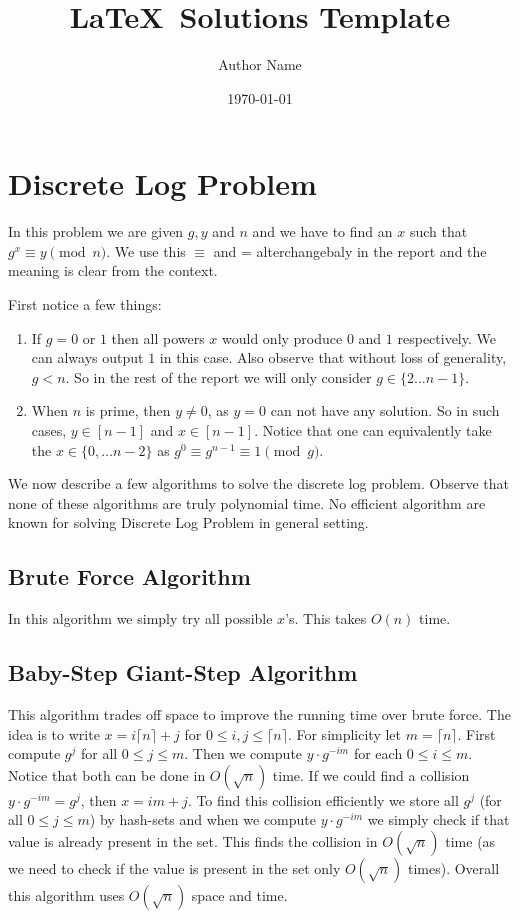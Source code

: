 \documentclass[letterpaper,12pt]{article}
\theoremstyle{remark}
\begin{document}
\title{\LaTeX\ Solutions Template}
\date{\today}
\author{Author Name}
\maketitle

\section{Discrete Log Problem}

In this problem we are given $g, y$ and $n$ and we have to find an $x$ such that $g^x \equiv y \pmod n$. We use this $\equiv$ and = alterchangebaly in the report and the meaning is clear from the context.

First notice a few things:
\begin{enumerate}
    \item If $g = 0$ or $1$ then all powers $x$ would only produce $0$ and $1$ respectively. We can always output $1$ in this case. Also observe that without loss of generality, $g < n$. So in the rest of the report we will only consider $g \in \{2 \dots n-1\}$. 
    \item When $n$ is prime, then $y \neq 0$, as $y = 0$ can not have any solution. So in such cases, $y \in [n-1]$ and $x \in [n-1]$. Notice that one can equivalently take the $x \in \{0, \dots n-2\}$ as $g^0 \equiv g^{n-1} \equiv 1 \pmod g$.
\end{enumerate}

We now describe a few algorithms to solve the discrete log problem. Observe that none of these algorithms are truly polynomial time. No efficient algorithm are known for solving Discrete Log Problem in general setting.

\subsection{Brute Force Algorithm}
In this algorithm we simply try all possible $x$'s. This takes $O(n)$ time.

\subsection{Baby-Step Giant-Step Algorithm}

This algorithm trades off space to improve the running time over brute force. The idea is to write $x = i\lceil n \rceil + j$ for $0 \le i,j \le \lceil n \rceil$. For simplicity let $m = \lceil n \rceil$. First compute $g^j$ for all $0 \le j \le m$. Then we compute $y\cdot g^{-im}$ for each $0 \le i \le m$. Notice that both can be done in $O(\sqrt n )$ time. If we could find a collision $y\cdot g^{-im} = g^j$, then $x = im + j$. To find this collision efficiently we store all $g^j$ (for all $0 \le j \le m$) by hash-sets and when we compute $y\cdot g^{-im}$ we simply check if that value is already present in the set. This finds the collision in $O(\sqrt{n})$ time (as we need to check if the value is present in the set only $O(\sqrt{n})$ times). Overall this algorithm uses $O(\sqrt{n})$ space and time.
\end{document}
